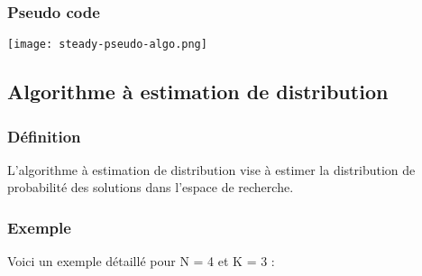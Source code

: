 \documentclass{article}
\begin{document}
\subsubsection{Pseudo code}

\texttt{[image: steady-pseudo-algo.png]}

\subsection{Algorithme à estimation de distribution}
\subsubsection{Définition}
L'algorithme à estimation de distribution vise à estimer la distribution de probabilité des solutions dans l'espace de recherche.

\subsubsection{Exemple}
Voici un exemple détaillé pour N = 4 et K = 3 :
\end{document}
